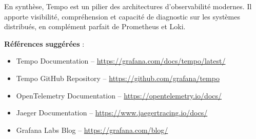 En synthèse, Tempo est un pilier des architectures d’observabilité modernes. Il apporte visibilité, compréhension et capacité de diagnostic sur les systèmes distribués, en complément parfait de Prometheus et Loki.

\textbf{Références suggérées} :
\begin{itemize}
	\item Tempo Documentation – \url{https://grafana.com/docs/tempo/latest/}
	\item Tempo GitHub Repository – \url{https://github.com/grafana/tempo}
	\item OpenTelemetry Documentation – \url{https://opentelemetry.io/docs/}
	\item Jaeger Documentation – \url{https://www.jaegertracing.io/docs/}
	\item Grafana Labs Blog – \url{https://grafana.com/blog/}
\end{itemize}





